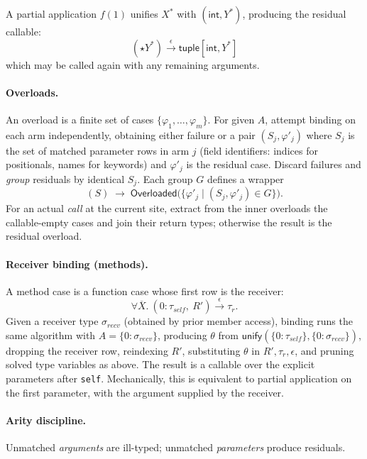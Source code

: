 A partial application $f(1)$ unifies $X^*$ with $(\mathsf{int}, Y^*)$, producing the residual callable:
\[
(\star Y^*) \xrightarrow{\epsilon} \mathsf{tuple}[\mathsf{int}, Y^*]
\]
which may be called again with any remaining arguments.

\paragraph{Overloads.}
An overload is a finite set of cases $\{ \varphi_1,\dots,\varphi_m \}$.
For given $A$, attempt binding on each arm independently, obtaining
either failure or a pair $(S_j,\varphi'_j)$ where $S_j$ is the set of matched parameter
rows in arm $j$ (field identifiers: indices for positionals, names for keywords) and $\varphi'_j$ is the residual case.
Discard failures and \emph{group} residuals by identical $S_j$.
Each group $G$ defines a wrapper
\[
(S) \;\to\; \mathsf{Overloaded}\bigl(\{\varphi'_j \mid (S_j,\varphi'_j)\in G\}\bigr).
\]
For an actual \emph{call} at the current site, extract from the inner overloads
the callable-empty cases and join their return types; otherwise the result is the residual overload.

\paragraph{Receiver binding (methods).}
A method case is a function case whose first row is the receiver:
\[
\forall \overline{X}.~(0:\tau_{\mathit{self}},~R') \xrightarrow{\epsilon} \tau_r.
\]
Given a receiver type $\sigma_{\mathit{recv}}$ (obtained by prior member access),
binding runs the same algorithm with $A=\{0:\sigma_{\mathit{recv}}\}$, producing
$\theta$ from $\mathsf{unify}(\{0:\tau_{\mathit{self}}\},\{0:\sigma_{\mathit{recv}}\})$,
dropping the receiver row, reindexing $R'$, substituting $\theta$ in $R',\tau_r,\epsilon$,
and pruning solved type variables as above. The result is a callable over the explicit
parameters after \texttt{self}. Mechanically, this is equivalent to partial application
on the first parameter, with the argument supplied by the receiver.

\paragraph{Arity discipline.}
Unmatched \emph{arguments} are ill-typed; unmatched \emph{parameters} produce residuals.

